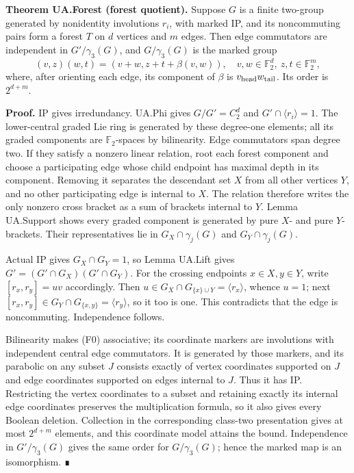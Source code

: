 \documentclass[
  11pt,
  a4paper,
]{article}
\begin{document}
\textbf{Theorem UA.Forest (forest quotient).} Suppose \(G\) is a finite
two-group generated by nonidentity involutions \(r_i\), with marked IP,
and its noncommuting pairs form a forest \(T\) on \(d\) vertices and
\(m\) edges. Then edge commutators are independent in
\(G'/\gamma_3(G)\), and \(G/\gamma_3(G)\) is the marked group \[
 (v,z)(w,t)=(v+w,z+t+\beta(v,w)),\quad
 v,w\in\mathbb F_2^d,\ z,t\in\mathbb F_2^m,               \tag{F0}
\] where, after orienting each edge, its component of \(\beta\) is
\(v_{\rm head}w_{\rm tail}\). Its order is \(2^{d+m}\).

\textbf{Proof.} IP gives irredundancy. UA.Phi gives \(G/G'=C_2^d\) and
\(G'\cap\langle r_i\rangle=1\). The lower-central graded Lie ring is
generated by these degree-one elements; all its graded components are
\(\mathbb F_2\)-spaces by bilinearity. Edge commutators span degree two.
If they satisfy a nonzero linear relation, root each forest component
and choose a participating edge whose child endpoint has maximal depth
in its component. Removing it separates the descendant set \(X\) from
all other vertices \(Y\), and no other participating edge is internal to
\(X\). The relation therefore writes the only nonzero cross bracket as a
sum of brackets internal to \(Y\). Lemma UA.Support shows every graded
component is generated by pure \(X\)- and pure \(Y\)-brackets. Their
representatives lie in \(G_X\cap\gamma_j(G)\) and
\(G_Y\cap\gamma_j(G)\).

Actual IP gives \(G_X\cap G_Y=1\), so Lemma UA.Lift gives
\(G'=(G'\cap G_X)(G'\cap G_Y)\). For the crossing endpoints
\(x\in X,y\in Y\), write \([r_x,r_y]=uv\) accordingly. Then
\(u\in G_X\cap G_{\{x\}\cup Y}=\langle r_x\rangle\), whence \(u=1\);
next \([r_x,r_y]\in G_Y\cap G_{\{x,y\}}=\langle r_y\rangle\), so it too
is one. This contradicts that the edge is noncommuting. Independence
follows.

Bilinearity makes (F0) associative; its coordinate markers are
involutions with independent central edge commutators. It is generated
by those markers, and its parabolic on any subset \(J\) consists exactly
of vertex coordinates supported on \(J\) and edge coordinates supported
on edges internal to \(J\). Thus it has IP. Restricting the vertex
coordinates to a subset and retaining exactly its internal edge
coordinates preserves the multiplication formula, so it also gives every
Boolean deletion. Collection in the corresponding class-two presentation
gives at most \(2^{d+m}\) elements, and this coordinate model attains
the bound. Independence in \(G'/\gamma_3(G)\) gives the same order for
\(G/\gamma_3(G)\); hence the marked map is an isomorphism. ∎
\end{document}
